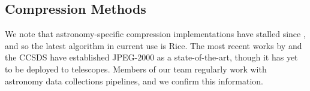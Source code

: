 
\subsection{Compression Methods}
\label{sec:methods}

We note that astronomy-specific compression implementations have stalled since \citet{pence2009lossless}, and so the latest algorithm in current use is Rice. The most recent works by \citep{maireles2023efficient} and the CCSDS \citep{ccsds2022} have established JPEG-2000 as a state-of-the-art, though it has yet to be deployed to telescopes. Members of our team regularly work with astronomy data collections pipelines, and we confirm this information.

